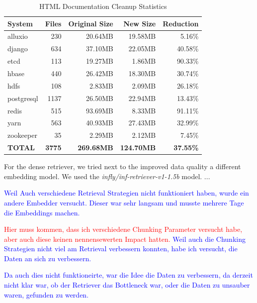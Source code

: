 \begin{table}[h]
    \centering
    \begin{tabular}{|l|r|r|r|r|}
        \hline
        \textbf{System} & \textbf{Files} & \textbf{Original Size} & \textbf{New Size} & \textbf{Reduction} \\
        \hline
        alluxio & 230 & 20.64MB & 19.58MB & 5.16\% \\
        django & 634 & 37.10MB & 22.05MB & 40.58\% \\
        etcd & 113 & 19.27MB & 1.86MB & 90.33\% \\
        hbase & 440 & 26.42MB & 18.30MB & 30.74\% \\
        hdfs & 108 & 2.83MB & 2.09MB & 26.18\% \\
        postgresql & 1137 & 26.50MB & 22.94MB & 13.43\% \\
        redis & 515 & 93.69MB & 8.33MB & 91.11\% \\
        yarn & 563 & 40.93MB & 27.43MB & 32.99\% \\
        zookeeper & 35 & 2.29MB & 2.12MB & 7.45\% \\
        \hline
        \textbf{TOTAL} & \textbf{3775} & \textbf{269.68MB} & \textbf{124.70MB} & \textbf{37.55\%} \\
        \hline
    \end{tabular}
    \caption{HTML Documentation Cleanup Statistics}
    \label{tab:cleanup_stats}
\end{table}

For the dense retriever, we tried next to the improved data quality a different embedding model. We used the \textit{infly/inf-retriever-v1-1.5b}\cite{infly-ai_2025} model. ...


\textcolor{blue}{Weil Auch verschiedene Retrieval Strategien nicht funktioniert haben, wurde ein andere Embedder versucht. Dieser war sehr langsam und musste mehrere Tage die Embeddings machen.}

\textcolor{red}{Hier muss kommen, dass ich verschiedene Chunking Parameter versucht habe, aber auch diese keinen nennensewerten Impact hatten.}
\textcolor{blue}{Weil auch die Chunking Strategien nicht viel am Retrieval verbessern konnten, habe ich versucht, die Daten an sich zu verbessern.}


\textcolor{blue}{Da auch dies nicht funktioneirte, war die Idee die Daten zu verbessern, da derzeit nicht klar war, ob der Retriever das Bottleneck war, oder die Daten zu unsauber waren, gefunden zu werden.}



